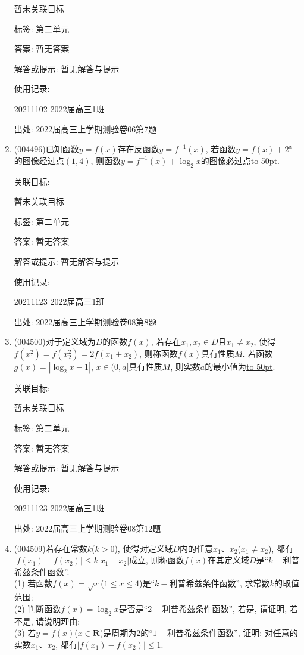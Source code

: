 \documentclass[10pt,a4paper]{article}
\newcommand{\blank}[1]{\underline{\hbox to #1pt{}}}
\begin{document}
\begin{enumerate}[1.]
暂未关联目标



标签: 第二单元

答案: 暂无答案

解答或提示: 暂无解答与提示

使用记录:

20211102	2022届高三1班	


出处: 2022届高三上学期测验卷06第7题
\item { (004496)}已知函数$y=f(x)$存在反函数$y=f^{-1}(x)$, 若函数$y=f(x)+2^x$的图像经过点$(1,4)$, 则函数$y=f^{-1}(x)+\log_2x$的图像必过点\blank{50}.


关联目标:

暂未关联目标



标签: 第二单元

答案: 暂无答案

解答或提示: 暂无解答与提示

使用记录:

20211123	2022届高三1班	


出处: 2022届高三上学期测验卷08第8题
\item { (004500)}对于定义域为$D$的函数$f(x)$, 若存在$x_1,x_2\in D$且$x_1\ne x_2$, 使得$f(x_1^2)=f(x_2^2)=2f(x_1+x_2)$, 则称函数$f(x)$具有性质$M$. 若函数$g(x)=|\log_2x-1|$, $x\in (0,a]$具有性质$M$, 则实数$a$的最小值为\blank{50}.


关联目标:

暂未关联目标



标签: 第二单元

答案: 暂无答案

解答或提示: 暂无解答与提示

使用记录:

20211123	2022届高三1班	


出处: 2022届高三上学期测验卷08第12题
\item { (004509)}若存在常数$k$($k>0$), 使得对定义域$D$内的任意$x_1$、$x_2$($x_1\ne x_2$), 都有$|f(x_1)-f(x_2)|\le k|x_1-x_2|$成立, 则称函数$f(x)$在其定义域$D$是``$k-$利普希兹条件函数''.\\
(1) 若函数$f(x)=\sqrt x$($1\le x\le 4$)是``$k-$利普希兹条件函数'', 求常数$k$的取值范围;\\
(2) 判断函数$f(x)=\log_2x$是否是``$2-$利普希兹条件函数'', 若是, 请证明, 若不是, 请说明理由;\\
(3) 若$y=f(x)$($x\in \mathbf{R}$)是周期为2的``$1-$利普希兹条件函数'', 证明: 对任意的实数$x_1$、$x_2$, 都有$|f(x_1)-f(x_2)|\le 1$.



\end{enumerate}
\end{document}
